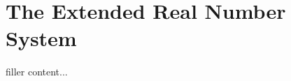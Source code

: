 \documentclass[../../templates/section]{subfiles}
\begin{document}
\section{The Extended Real Number System}\label{sec:the-extended-real-number-system}

filler content...
\end{document}
